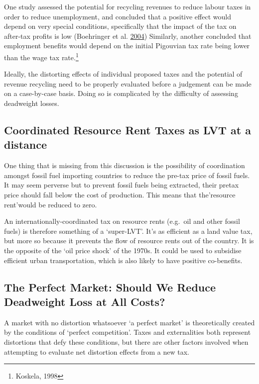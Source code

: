 \documentclass[]{tufte-handout}
\begin{document}
One study assessed the potential for recycling revenues to reduce labour
taxes in order to reduce unemployment, and concluded that a positive
effect would depend on very special conditions, specifically that the
impact of the tax on after-tax profits is low (Boehringer et al.
\protect\hyperlink{ref-Boehringer2004}{2004}) Similarly, another
concluded that employment benefits would depend on the initial Pigouvian
tax rate being lower than the wage tax rate.\footnote{Koskela, 1998}

Ideally, the distorting effects of individual proposed taxes and the
potential of revenue recycling need to be properly evaluated before a
judgement can be made on a case-by-case basis. Doing so is complicated
by the difficulty of assessing deadweight losses.

\hypertarget{coordinated-resource-rent-taxes-as-lvt-at-a-distance}{%
\subsection{Coordinated Resource Rent Taxes as LVT at a
distance}\label{coordinated-resource-rent-taxes-as-lvt-at-a-distance}}

One thing that is missing from this discussion is the possibility of
coordination amongst fossil fuel importing countries to reduce the
pre-tax price of fossil fuels. It may seem perverse but to prevent
fossil fuels being extracted, their pretax price should fall below the
cost of production. This means that the'resource rent'would be reduced
to zero.

An internationally-coordinated tax on resource rents (e.g.~oil and other
fossil fuels) is therefore something of a `super-LVT'. It's as efficient
as a land value tax, but more so because it prevents the flow of
resource rents out of the country. It is the opposite of the `oil price
shock' of the 1970s. It could be used to subsidise efficient urban
transportation, which is also likely to have positive co-benefits.

\hypertarget{the-perfect-market-should-we-reduce-deadweight-loss-at-all-costs}{%
\subsection{The Perfect Market: Should We Reduce Deadweight Loss at All
Costs?}\label{the-perfect-market-should-we-reduce-deadweight-loss-at-all-costs}}

A market with no distortion whatsoever `a perfect market' is
theoretically created by the conditions of `perfect competition'. Taxes
and externalities both represent distortions that defy these conditions,
but there are other factors involved when attempting to evaluate net
distortion effects from a new tax.
\end{document}
